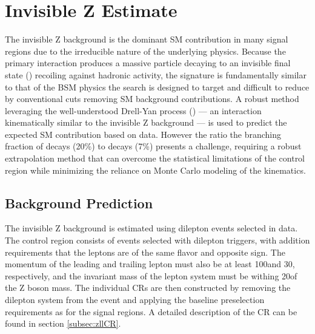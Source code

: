 \section{Invisible Z Estimate}
\label{sec:zinv}

The invisible Z background is the dominant SM contribution in many signal regions due to the irreducible nature of the underlying physics. Because the primary interaction produces a massive particle decaying to an invisible final state (\znunu) recoiling against hadronic activity, the signature is fundamentally similar to that of the BSM physics the search is designed to target and difficult to reduce by conventional cuts removing SM background contributions. A robust method leveraging the well-understood Drell-Yan process (\zll) --- an interaction kinematically similar to the invisible Z background --- is used to predict the expected SM contribution based on data. However the ratio the branching fraction of \znunu decays (20\%) to \zll decays (7\%) presents a challenge, requiring a robust extrapolation method that can overcome the statistical limitations of the control region while minimizing the reliance on Monte Carlo modeling of the kinematics. 

\subsection{Background Prediction}
\label{subsec:zinvPrediction}
The invisible Z background is estimated using dilepton events selected in data. The control region consists of events selected with dilepton triggers, with addition requirements that the leptons are of the same flavor and opposite sign. The momentum of the leading and trailing lepton must also be at least 100\GeV and 30\GeV, respectively, and the invariant mass of the lepton system \mll must be withing 20\GeV of the Z boson mass. The individual CRs are then constructed by removing the dilepton system from the event and applying the baseline preselection requirements as for the signal regions. A detailed description of the CR can be found in section \ref{subsec:zllCR}.

